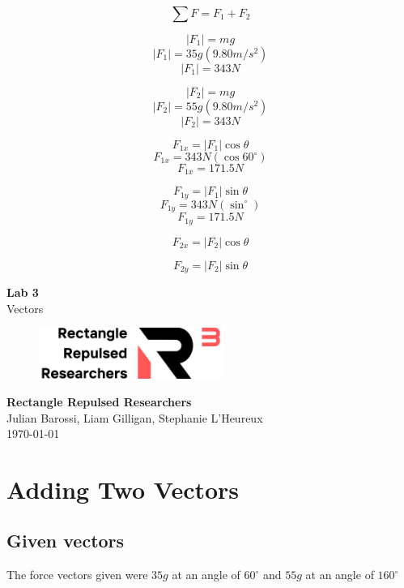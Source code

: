 \documentclass[11pt, letterpaper, includehead]{article}
\begin{document}
$$\sum F = F_{1} + F_{2}$$

$$|F_1| = mg$$
$$|F_1| = 35g(9.80m/s^2)$$
$$|F_1| = 343N$$

$$|F_2| = mg$$
$$|F_2| = 55g(9.80m/s^2)$$
$$|F_2| = 343N$$

$$F_{1x} = |F_1|\cos\theta$$
$$F_{1x} = 343N(\cos60^{\circ})$$
$$F_{1x} = 171.5N$$

$$F_{1y} = |F_1|\sin\theta$$
$$F_{1y} = 343N(\sin^{\circ})$$
$$F_{1y} = 171.5N$$

$$F_{2x} = |F_2|\cos\theta$$

$$F_{2y} = |F_2|\sin\theta$$


\begin{titlepage}
  \begin{center}
    \Huge{\textbf{Lab 3}}\\
    \Huge{Vectors}
    \vfill
    \begin{figure}[H] %
      \centering 
      \includegraphics[width=6cm]{../logo.png}
    \end{figure}
    \large{\textbf{Rectangle Repulsed Researchers}}\\
    \large{Julian Barossi, Liam Gilligan, Stephanie L'Heureux}\\
    \vspace{0.5cm}
    \normalsize
    \today
  \end{center}
\end{titlepage}

\tableofcontents
\pagebreak %

\pagestyle{fancy}
\fancyhead{}

\pagebreak 

\section{Adding Two Vectors} %

\subsection{Given vectors} %
The force vectors given were $35g$ at an angle of $60^{\circ}$ and $55g$ at an angle of $160^{\circ}$
\end{document}
